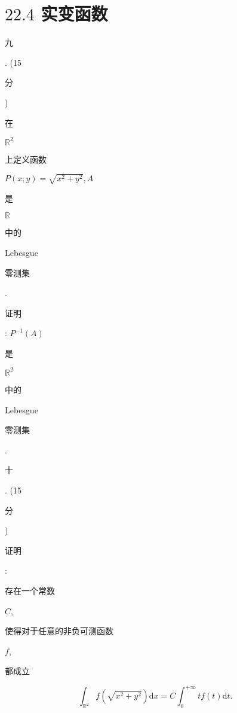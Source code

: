 \documentclass[10pt]{article}
\begin{document}
\section{$22.4$ 实变函数}
\begin{CJK}{UTF8}{mj}九\end{CJK}. (15 \begin{CJK}{UTF8}{mj}分\end{CJK}) \begin{CJK}{UTF8}{mj}在\end{CJK} $\mathbb{R}^{2}$ \begin{CJK}{UTF8}{mj}上定义函数\end{CJK} $P(x, y)=\sqrt{x^{2}+y^{2}}, A$ \begin{CJK}{UTF8}{mj}是\end{CJK} $\mathbb{R}$ \begin{CJK}{UTF8}{mj}中的\end{CJK} Lebesgue \begin{CJK}{UTF8}{mj}零测集\end{CJK}. \begin{CJK}{UTF8}{mj}证明\end{CJK}: $P^{-1}(A)$ \begin{CJK}{UTF8}{mj}是\end{CJK} $\mathbb{R}^{2}$ \begin{CJK}{UTF8}{mj}中的\end{CJK} Lebesgue \begin{CJK}{UTF8}{mj}零测集\end{CJK}.

\begin{CJK}{UTF8}{mj}十\end{CJK}. (15 \begin{CJK}{UTF8}{mj}分\end{CJK}) \begin{CJK}{UTF8}{mj}证明\end{CJK}: \begin{CJK}{UTF8}{mj}存在一个常数\end{CJK} $C$, \begin{CJK}{UTF8}{mj}使得对于任意的非负可测函数\end{CJK} $f$, \begin{CJK}{UTF8}{mj}都成立\end{CJK}
$$
\int_{\mathbb{R}^{2}} f\left(\sqrt{x^{2}+y^{2}}\right) \mathrm{d} x=C \int_{0}^{+\infty} t f(t) \mathrm{d} t .
$$
\end{document}
